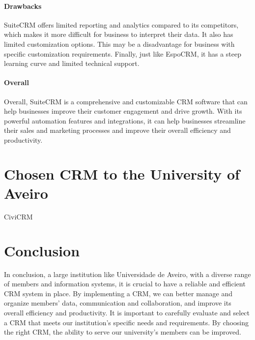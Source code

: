 \documentclass{article}
\begin{document}
\paragraph{Drawbacks}

SuiteCRM offers limited reporting and analytics compared to its competitors, which makes it more difficult for business to interpret their data. It also has limited customization options. This may be a disadvantage for business with specific customization requirements. Finally, just like EspoCRM, it has a steep learning curve and limited technical support.

\paragraph{Overall}

Overall, SuiteCRM is a comprehensive and customizable CRM software that can help businesses improve their customer engagement and drive growth. With its powerful automation features and integrations, it can help businesses streamline their sales and marketing processes and improve their overall efficiency and productivity.

\section{Chosen CRM to the University of Aveiro}

CiviCRM




\section{Conclusion}

In conclusion, a large institution like Universidade de Aveiro, with a diverse range of members and information systems, it is crucial to have a reliable and efficient CRM system in place. By implementing a CRM, we can better manage and organize members' data, communication and collaboration, and improve its overall efficiency and productivity. It is important to carefully evaluate and select a CRM that meets our institution's specific needs and requirements. By choosing the right CRM, the ability to serve our university's members can be improved.


\nocite{*}
\printbibliography
\end{document}
